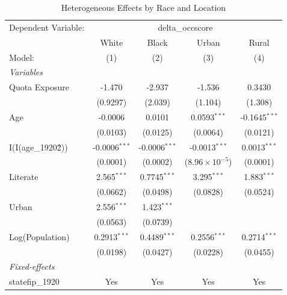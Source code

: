 
\begin{table}[htbp]
   \caption{\label{tab:heterogeneity} Heterogeneous Effects by Race and Location}
   \centering
   \begin{tabular}{lcccc}
      \tabularnewline \midrule \midrule
      Dependent Variable: & \multicolumn{4}{c}{delta\_occscore}\\
                           & White           & Black           & Urban                   & Rural \\   
      Model:               & (1)             & (2)             & (3)                     & (4)\\  
      \midrule
      \emph{Variables}\\
      Quota Exposure       & -1.470          & -2.937          & -1.536                  & 0.3430\\   
                           & (0.9297)        & (2.039)         & (1.104)                 & (1.308)\\   
      Age                  & -0.0006         & 0.0101          & 0.0593$^{***}$          & -0.1645$^{***}$\\   
                           & (0.0103)        & (0.0125)        & (0.0064)                & (0.0121)\\   
      I(I(age\_1920\^2))   & -0.0006$^{***}$ & -0.0006$^{***}$ & -0.0013$^{***}$         & 0.0013$^{***}$\\   
                           & (0.0001)        & (0.0002)        & ($8.96\times 10^{-5}$)  & (0.0001)\\   
      Literate             & 2.565$^{***}$   & 0.7745$^{***}$  & 3.295$^{***}$           & 1.883$^{***}$\\   
                           & (0.0662)        & (0.0498)        & (0.0828)                & (0.0524)\\   
      Urban                & 2.556$^{***}$   & 1.423$^{***}$   &                         &   \\   
                           & (0.0563)        & (0.0739)        &                         &   \\   
      Log(Population)      & 0.2913$^{***}$  & 0.4489$^{***}$  & 0.2556$^{***}$          & 0.2714$^{***}$\\   
                           & (0.0198)        & (0.0427)        & (0.0228)                & (0.0455)\\   
      \midrule
      \emph{Fixed-effects}\\
      statefip\_1920       & Yes             & Yes             & Yes                     & Yes\\  

\end{tabular}
\end{table}
